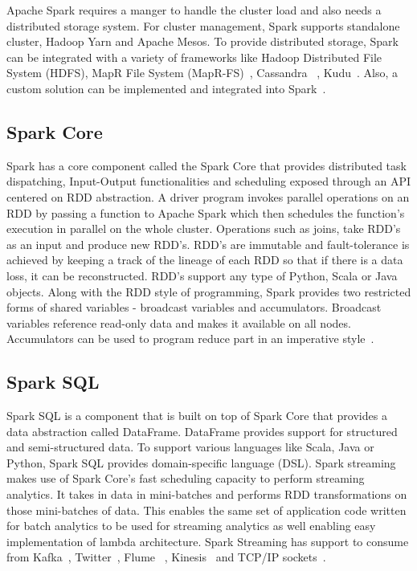 Apache Spark requires  a manger to handle the cluster load and also needs a 
distributed storage system. For cluster management, Spark supports standalone 
cluster, Hadoop Yarn and Apache Mesos. To provide distributed storage, Spark 
can be integrated with a variety of frameworks like Hadoop Distributed File 
System (HDFS), MapR File System (MapR-FS)~\cite{hid-sp18-408-maprfs}, Cassandra
~\cite{hid-sp18-408-cassandra}, Kudu~\cite{hid-sp18-408-kudu}. Also, a custom 
solution can be implemented and integrated into Spark~\cite{hid-sp18-408-Spark}. 

\subsection{Spark Core}
Spark has a core component called the Spark Core that provides distributed task 
dispatching, Input-Output functionalities and scheduling exposed through an API 
centered on RDD abstraction. A driver program invokes parallel operations on an 
RDD by passing a function to Apache Spark which then schedules the function's 
execution in parallel on the whole cluster. Operations such as joins, take RDD's 
as an input and produce new RDD's. RDD's are immutable and fault-tolerance is 
achieved by keeping a track of the lineage of each RDD so that if there is a 
data loss, it can be reconstructed. RDD's support any type of Python, Scala or 
Java objects. Along with the RDD style of programming, Spark provides two 
restricted forms of shared variables - broadcast variables and accumulators. 
Broadcast variables reference read-only data and makes it available on all 
nodes. Accumulators can be used to program reduce part 
in an imperative style~\cite{hid-sp18-408-Spark}. 

\subsection{Spark SQL}
Spark SQL is a component that is built on top of Spark Core that provides a data 
abstraction called DataFrame. DataFrame provides support for structured and 
semi-structured data. To support various languages like Scala, Java or Python, 
Spark SQL provides domain-specific language (DSL). Spark streaming makes use of 
Spark Core's fast scheduling capacity to perform streaming analytics. It takes
in data in mini-batches and performs RDD transformations on those mini-batches 
of data. This enables the same set of application code written for batch 
analytics to be used for streaming analytics as well enabling easy 
implementation of lambda architecture. Spark Streaming has support to consume 
from Kafka~\cite{hid-sp18-408-Kafka}, Twitter~\cite{hid-sp18-408-twitter}, Flume
~\cite{hid-sp18-408-flume}, Kinesis~\cite{hid-sp18-408-kinesis} and TCP/IP 
sockets~\cite{hid-sp18-408-Spark}.

